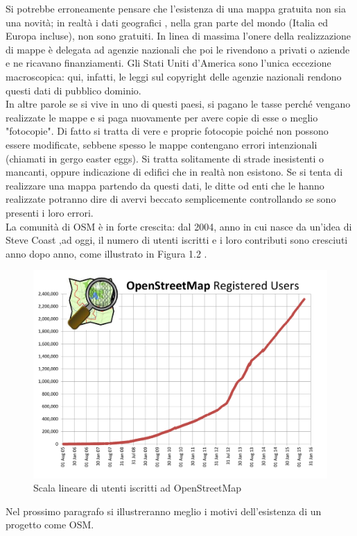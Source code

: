 Si potrebbe erroneamente pensare che l'esistenza di una mappa gratuita non sia una novità; in realtà  i dati geografici \cite{MAPPE_LIBERE}, nella gran parte del mondo (Italia ed Europa incluse), non sono gratuiti. In linea di massima l'onere della realizzazione di mappe è delegata ad agenzie nazionali che poi le rivendono a privati o aziende e ne ricavano finanziamenti. Gli Stati Uniti d'America sono l'unica eccezione macroscopica: qui, infatti, le leggi sul copyright delle agenzie nazionali rendono questi dati di pubblico dominio.\\
In altre parole se si vive in uno di questi paesi, si pagano le tasse perché vengano realizzate le mappe e si paga nuovamente per avere copie di esse o meglio "fotocopie". Di fatto si tratta di vere e proprie fotocopie poiché non possono essere modificate, sebbene spesso le mappe contengano errori intenzionali (chiamati in gergo easter eggs). Si tratta solitamente di strade inesistenti o mancanti, oppure indicazione di edifici che in realtà non esistono. Se si tenta di realizzare una mappa partendo da questi dati, le ditte od enti che le hanno realizzate potranno dire di avervi beccato semplicemente controllando se sono presenti i loro errori.\\
La comunità di OSM è in forte crescita: dal 2004, anno in cui nasce da un'idea di Steve Coast ,ad oggi, il numero di utenti iscritti e i loro contributi sono cresciuti anno dopo anno, come illustrato in Figura 1.2 .
\begin{figure}[H]
	\centering
	\includegraphics[scale=0.5]{OpenStreetMap/utenti.png}
	\caption{Scala lineare di utenti iscritti ad OpenStreetMap}
	\label{fig:utenti_OSM}
\end{figure}
Nel prossimo paragrafo si illustreranno meglio i motivi dell'esistenza di un progetto come OSM.


